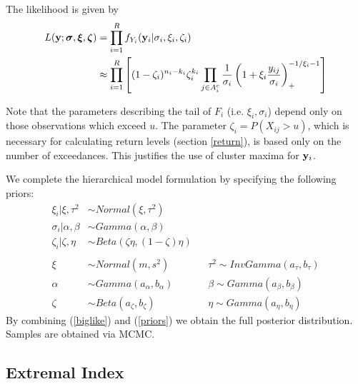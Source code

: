 The likelihood is given by
\begin{align}
L(\mathbf{\bm{y}}; \mathbf{\bm{\sigma}}, \mathbf{\bm{\xi}}, \mathbf{\bm{\zeta}}) &= \prod_{i=1}^R f_{Y_i}(\mathbf{\bm{y}}_i|\sigma_i,\xi_i,\zeta_i) \nonumber \\
&\approx \prod_{i=1}^R\left[(1-\zeta_i)^{n_i-k_i}\zeta_i^{k_i}\prod_{j\in A_i^c}\frac{1}{\sigma_i}\left(1+\xi_i\frac{y_{ij}}{\sigma_i}\right)_+^{-1/\xi_i-1}\right] \label{biglike}
\end{align}

Note that the parameters describing the tail of $F_i$ (i.e. $\xi_i,\sigma_i$) depend only on those observations which exceed $u$. The parameter $\zeta_i=P(X_{ij}>u)$, which is necessary for calculating return levels (section \ref{return}), is based only on the number of exceedances. This justifies the use of cluster maxima for $\mathbf{\bm{y}}_i$.

We complete the hierarchical model formulation by specifying the following priors:
\begin{align}
\xi_i|\xi, \tau^2  &\sim Normal(\xi, \tau^2) \nonumber \\
\sigma_i|\alpha, \beta &\sim Gamma(\alpha, \beta) \nonumber \\
\zeta_i|\zeta, \eta &\sim Beta(\zeta\eta, (1-\zeta)\eta) \nonumber \\
 \label{priors} \\
\xi &\sim Normal(m, s^2)&  &\tau^2 \sim InvGamma(a_\tau, b_\tau) \nonumber \\
\alpha &\sim Gamma(a_\alpha, b_\alpha)&  &\beta \sim Gamma(a_\beta, b_\beta) \nonumber \\
\zeta &\sim Beta(a_\zeta, b_\zeta)&  &\eta \sim Gamma(a_\eta, b_\eta) \nonumber
\end{align}
By combining (\ref{biglike}) and (\ref{priors}) we obtain the full posterior distribution. Samples are obtained via MCMC.


\subsection{Extremal Index}
\label{index}

